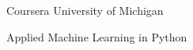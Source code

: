 

\begin{cventries}

  \cventry
    {Coursera}
    {University of Michigan}
    {}
    {}
    {
      \begin{cvitems} %
        \item {Applied Machine Learning in Python}
      \end{cvitems}
    }

\end{cventries}
